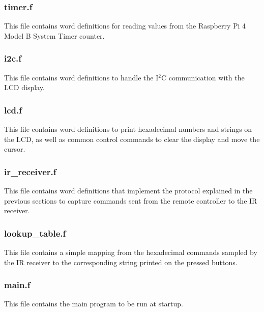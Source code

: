 \documentclass[a4paper, 12pt]{article}
\begin{document}
\subsubsection{timer.f}
This file contains word definitions for reading values from the Raspberry Pi 4 Model B System Timer counter.

\subsubsection{i2c.f}
This file contains word definitions to handle the I$^2$C communication with the LCD display.

\subsubsection{lcd.f}
This file contains word definitions to print hexadecimal numbers and strings on the LCD, as well as common control commands to clear the display and move the cursor.

\subsubsection{ir\_receiver.f}
This file contains word definitions that implement the protocol explained in the previous sections to capture commands sent from the remote controller to the IR receiver.

\subsubsection{lookup\_table.f}
This file contains a simple mapping from the hexadecimal commands sampled by the IR receiver to the corresponding string printed on the pressed buttons.

\subsubsection{main.f}
This file contains the main program to be run at startup.
\end{document}
